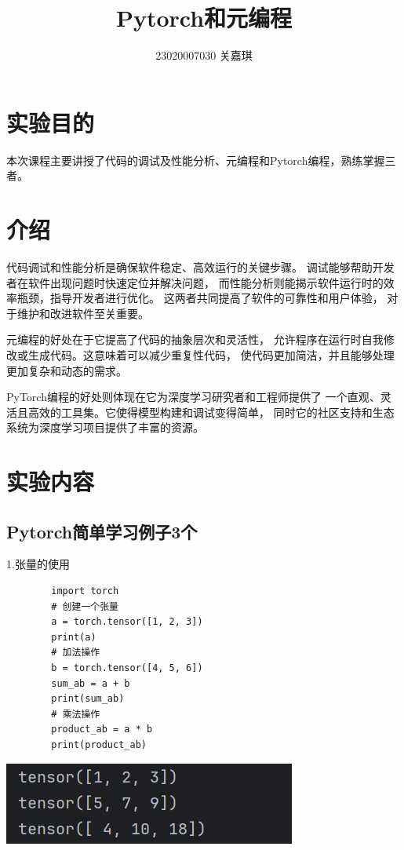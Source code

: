 \documentclass{article}
\title{Pytorch和元编程}
\author{23020007030  关嘉琪}
\begin{document}
	
	\maketitle
	
	\section{实验目的}
	本次课程主要讲授了代码的调试及性能分析、元编程和Pytorch编程，熟练掌握三者。
	
	\section{介绍}
	代码调试和性能分析是确保软件稳定、高效运行的关键步骤。
	调试能够帮助开发者在软件出现问题时快速定位并解决问题，
	而性能分析则能揭示软件运行时的效率瓶颈，指导开发者进行优化。
	这两者共同提高了软件的可靠性和用户体验，
	对于维护和改进软件至关重要。
	
	元编程的好处在于它提高了代码的抽象层次和灵活性，
	允许程序在运行时自我修改或生成代码。这意味着可以减少重复性代码，
	使代码更加简洁，并且能够处理更加复杂和动态的需求。
	
	PyTorch编程的好处则体现在它为深度学习研究者和工程师提供了
	一个直观、灵活且高效的工具集。它使得模型构建和调试变得简单，
	同时它的社区支持和生态系统为深度学习项目提供了丰富的资源。
	
	\section{实验内容}
	
	\subsection{Pytorch简单学习例子3个}
	1.张量的使用 
	\begin{verbatim}
		import torch
		# 创建一个张量
		a = torch.tensor([1, 2, 3])
		print(a)
		# 加法操作
		b = torch.tensor([4, 5, 6])
		sum_ab = a + b
		print(sum_ab)
		# 乘法操作
		product_ab = a * b
		print(product_ab)
	\end{verbatim}
	
	\begin{minipage}{\linewidth}
		\centering
		\includegraphics[width=0.5\linewidth]{example1.png}
		\label{fig:example}
	\end{minipage}
	
\end{document}
